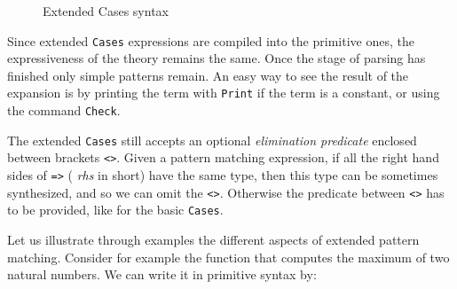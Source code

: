\begin{figure}[t]
\begin{center}
\end{center}
\caption{Extended Cases syntax}
\label{cases-grammar}
\end{figure}

Since extended {\tt Cases} expressions are compiled into the primitive
ones, the expressiveness of the theory remains the same. Once the
stage of parsing has finished only simple patterns remain. An easy way
to see the result of the expansion is by printing the term with
\texttt{Print} if the term is a constant, or using the command
\texttt{Check}.

The extended \texttt{Cases} still accepts an optional {\em elimination
predicate} enclosed between brackets \texttt{<>}.  Given a pattern
matching expression, if all the right hand sides of \texttt{=>} ({\em
rhs} in short) have the same type, then this type can be sometimes
synthesized, and so we can omit the \texttt{<>}. Otherwise 
the predicate between \texttt{<>} has to be provided, like for the basic
\texttt{Cases}.

Let us illustrate through examples the different aspects of extended
pattern matching. Consider for example the function that computes the
maximum of two natural numbers. We can write it in primitive syntax
by:


